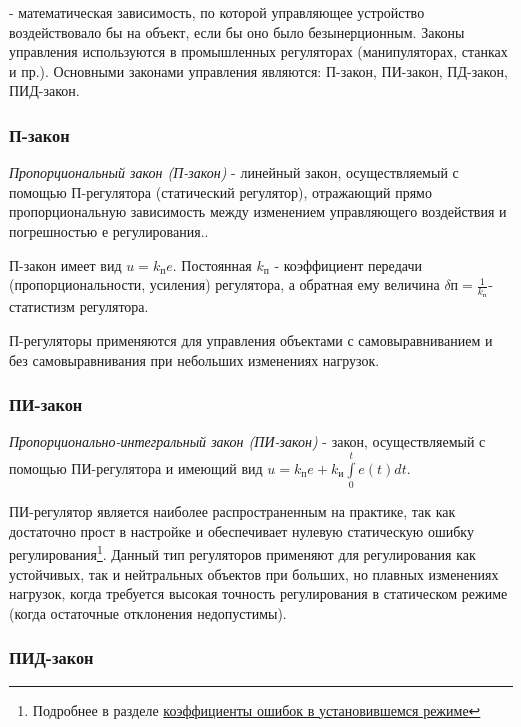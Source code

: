 \documentclass[../../TAU.tex]{subfiles}
\begin{document}
     - математическая зависимость, по которой управляющее устройство воздействовало бы на объект, если бы оно было безынерционным. Законы управления используются в промышленных регуляторах (манипуляторах, станках и пр.). Основными законами управления являются: П-закон, ПИ-закон, ПД-закон, ПИД-закон.

\subsubsection{П-закон}

    {\it Пропорциональный закон (П-закон)} - линейный закон, осуществляемый с помощью П-регулятора (статический регулятор), отражающий прямо пропорциональную зависимость между изменением управляющего воздействия и погрешностью $е$ регулирования.. \par
    П-закон имеет вид $u = k_{\text{п}} e$.  Постоянная $k_{\text{п}}$ - коэффициент передачи (пропорциональности, усиления) регулятора, а обратная ему величина $\delta\text{п}=\frac{1}{k_{\text{п}}}$- статистизм регулятора.  \par
    П-регуляторы применяются для управления объектами с самовыравниванием и без самовыравнивания при небольших изменениях нагрузок. 


\subsubsection{ПИ-закон}

    {\it Пропорционально-интегральный закон (ПИ-закон)} - закон, осуществляемый с помощью ПИ-регулятора и имеющий вид $u=k_\text{п}e+ k_\text{и}\int\limits_0^t e(t) dt$.  
    
    ПИ-регулятор является наиболее распространенным на практике, так как достаточно прост в настройке и обеспечивает нулевую статическую ошибку регулирования\footnote{Подробнее в разделе \hyperref[sec:errors]{коэффициенты ошибок в установившемся режиме}}. Данный тип регуляторов применяют для регулирования как устойчивых, так и нейтральных объектов при больших, но плавных изменениях нагрузок, когда требуется высокая точность регулирования в статическом режиме (когда остаточные отклонения недопустимы).


\subsubsection{ПИД-закон}
\end{document}
